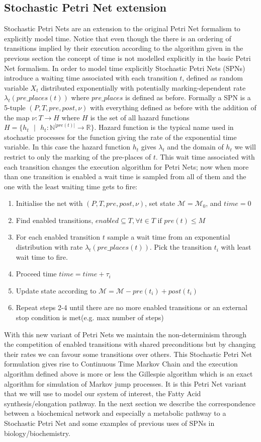 \subsection{Stochastic Petri Net extension}
Stochastic Petri Nets are an extension to the original Petri Net formalism to explicitly model time. Notice that
even though the there is an ordering of transitions implied by their execution according to the algorithm given 
in the previous section the concept of time is not modelled explicitly in the basic Petri Net formalism. In order
to model time explicitly Stochastic Petri Nets (SPNs) introduce a waiting time associated with each transition $t$, defined as random variable $X_t$ distributed exponentially with potentially marking-dependent rate $\lambda_t(pre\_places(t))$ where $pre\_places$ is defined as before. Formally a SPN is a 5-tuple $(P, T, pre, post, \nu)$ with everything defined as before with the addition of the map $\nu : T \rightarrow H$ where $H$ is the set of all hazard functions $H = \{h_t\mbox{ }|\mbox{ } h_t: \mathbb{N}^{|pre(t)|} \rightarrow \mathbb{R}\}$.
Hazard function is the typical name used in stochastic processes for the function giving the rate of the exponential time variable. In this case the hazard function $h_t$ gives $\lambda_t$ and the domain of $h_t$ we will restrict to only the marking of the pre-places of $t$. This wait time associated with each transition changes the execution algorithm for Petri Nets; now when more than one transition is enabled a wait time is sampled from all of them and the one with the least waiting time gets to fire:
\begin{enumerate}[noitemsep]
\item Initialise the net  with $(P, T, pre, post, \nu)$, set state $\mathcal{M} = \mathcal{M}_0$, and $time=0$
\item Find enabled transitions, $enabled \subseteq T, \forall t \in T \mbox{ if } pre(t) \leq M$
\item For each enabled transition $t$ sample a wait time from an exponential distribution with rate $\lambda_t(pre\_places(t))$. Pick the transition $t_i$ with least wait time to fire.
\item Proceed time $time = time + \tau_i$
\item Update state according to $\mathcal{M} = \mathcal{M} -pre(t_i) + post(t_i)$
\item Repeat steps 2-4 until there are no more enabled transitions or an external stop condition is met(e.g. max number of steps)
\end{enumerate}
With this new variant of Petri Nets we maintain the non-determinism through the competition of enabled transitions with shared preconditions but by changing their rates we can favour some transitions over others. This Stochastic Petri Net formulation gives rise to Continuous Time Markov Chain and the execution algorithm defined above is more or less the Gillespie algorithm which is an exact algorithm for simulation of Markov jump processes. It is this Petri Net variant that we will use to model our system of interest, the Fatty Acid synthesis/elongation pathway. In the next section we describe the correspondence between a biochemical network and especially a metabolic pathway to a Stochastic Petri Net and some examples of previous uses of SPNs in biology/biochemistry.
